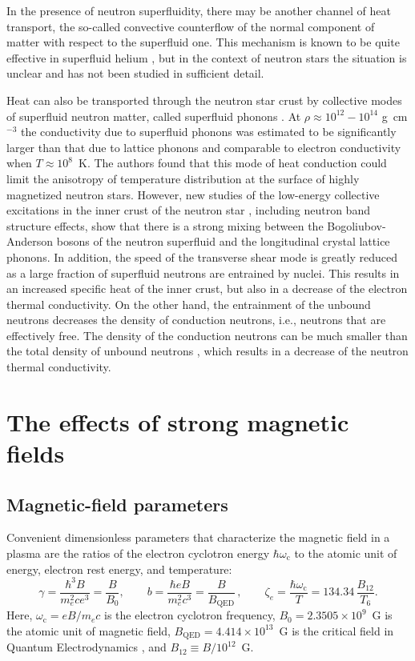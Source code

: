 \documentclass[smallextended]{svjour3}       %
\newcommand{\beq}{\begin{equation}}
\newcommand{\eeq}{\end{equation}}
\newcounter{count}
\newcommand{\gammam}{\gamma}
\newcommand{\gcc}{\mbox{g~cm$^{-3}$}}
\newcommand{\mel}{m_e}
\newcommand{\omc}{\omega_\mathrm{c}}
\newcommand{\zete}{\zeta_e}
\begin{document}
In the presence of neutron superfluidity, there may be
another channel of heat transport, the so-called convective
counterflow of the normal component of matter with respect to
the superfluid one. This mechanism is known to be quite
effective in superfluid helium \citep[e.g.,][]{Tilley90},
but in the context of neutron stars the situation is unclear and 
has not been studied in sufficient detail.

Heat can also be transported through the neutron star crust by
collective modes of superfluid neutron matter, called
superfluid phonons \citep{aguilera09}. At $\rho \approx
10^{12}-10^{14}$ \gcc{} the conductivity due to superfluid
phonons was estimated to be significantly larger than that
due to lattice phonons and comparable to electron
conductivity when $T \approx 10^8$~K. The authors found that
this mode of heat conduction could limit the
anisotropy of temperature distribution at the surface of
highly magnetized neutron stars. However, new
studies of  the low-energy collective excitations in the
inner crust of the neutron star \citep{Chamel12,Chamel13},
including neutron band structure effects, show that there is
a strong mixing between  the Bogoliubov-Anderson bosons of
the neutron superfluid and the longitudinal crystal lattice
phonons. In addition, the speed of the transverse shear mode
is  greatly reduced as a large fraction of superfluid
neutrons  are entrained by nuclei. This results in an
increased specific heat of the inner crust, but also in a
decrease of the electron thermal conductivity. On the other
hand, the entrainment of the unbound neutrons decreases the
density of conduction neutrons, i.e., neutrons that are
effectively free. The density of the conduction neutrons can
be much smaller than the total density of unbound neutrons
\citep{Chamel12}, which results in a decrease of the neutron
thermal conductivity.

\section{The effects of strong magnetic fields}
\label{sect:magnetic}

\subsection{Magnetic-field parameters}
\label{sect:mag-par}

Convenient dimensionless parameters that characterize the
magnetic field in a plasma are the ratios of the electron
cyclotron energy $\hbar\omc$ to the atomic unit of energy,
electron rest energy, and temperature:
\beq
   \gammam=
         \frac{\hbar^3 B }{ \mel^2 c e^3} =
         \frac{B}{B_0},
\qquad
   b=\frac{\hbar eB}{\mel^2 c^3} = 
           \frac{B}{B_\mathrm{QED}}\,,
\qquad
   \zete = \frac{\hbar\omc}{T} = 134.34\,\frac{
B_{12}}{T_6}.
\label{zeta_e}
\eeq
Here, $\omc=eB/\mel c$ is the electron cyclotron frequency,
$B_0=2.3505\times10^9$~G is the atomic unit of magnetic
field, $B_\mathrm{QED}=4.414\times10^{13}$~G is the critical
field in Quantum Electrodynamics \citep{Schwinger}, and
$B_{12}\equiv B/10^{12}$~G.
\end{document}
